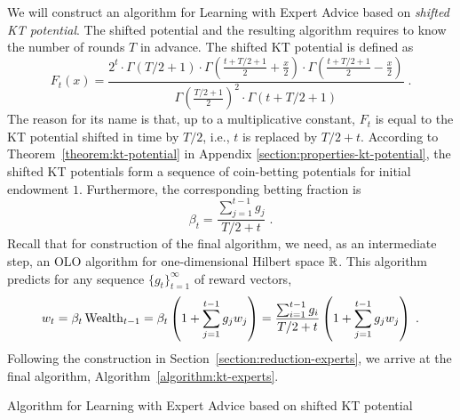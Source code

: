 We will construct an algorithm for Learning with Expert Advice based on
\emph{shifted KT potential}. The shifted potential and the resulting algorithm
requires to know the number of rounds $T$ in advance. The shifted KT
potential is defined as
$$
F_t(x) = \frac{2^t \cdot \Gamma\left(T/2 + 1 \right) \cdot \Gamma\left(\frac{t+T/2+1}{2} + \frac{x}{2} \right) \cdot \Gamma\left(\frac{t+T/2+1}{2} - \frac{x}{2} \right)}{\Gamma\left(\frac{T/2+1}{2} \right)^2 \cdot \Gamma \left(t+T/2+1\right)} \; .
$$
The reason for its name is that, up to a multiplicative constant, $F_t$ is equal
to the KT potential shifted in time by $T/2$, i.e., $t$ is replaced by $T/2+t$.
According to Theorem~\ref{theorem:kt-potential} in Appendix
\ref{section:properties-kt-potential}, the shifted KT potentials form
a sequence of coin-betting potentials for initial endowment $1$. Furthermore, the
corresponding betting fraction is
$$
\beta_t = \frac{\sum_{j=1}^{t-1} g_j}{T/2+t} \; .
$$
Recall that for construction of the final algorithm, we need, as an intermediate
step, an OLO algorithm for one-dimensional Hilbert space $\mathbb{R}$. This algorithm
predicts for any sequence $\{g_t\}_{t=1}^\infty$ of reward vectors,
$$
w_t
= \beta_t \operatorname{Wealth}_{t-1}
= \beta_t \left(1 + \sum_{j=1}^{t-1} g_j w_j \right)
= \frac{\sum_{i=1}^{t-1} g_i}{T/2+t} \left(1 + \sum_{j=1}^{t-1} g_j w_j \right) \; .
$$
Following the construction in Section~\ref{section:reduction-experts}, we arrive
at the final algorithm, Algorithm~\ref{algorithm:kt-experts}.

\begin{algorithm}[t]
\begin{algorithmic}
\caption{Algorithm for Learning with Expert Advice based on shifted KT potential
\label{algorithm:kt-experts}}
{
\ENDFOR
}
\end{algorithmic}
\end{algorithm}


